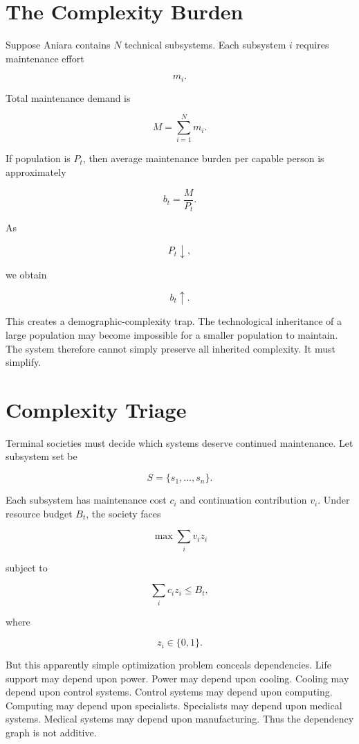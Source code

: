 \documentclass[11pt,oneside]{book}
\theoremstyle{definition}
\theoremstyle{remark}
\begin{document}
\section{The Complexity Burden}

Suppose Aniara contains \(N\) technical subsystems. Each subsystem \(i\) requires maintenance effort

\[
m_i.
\]

Total maintenance demand is

\[
M = \sum_{i=1}^{N}m_i.
\]

If population is \(P_t\), then average maintenance burden per capable person is approximately

\[
b_t = \frac{M}{P_t}.
\]

As

\[
P_t\downarrow,
\]

we obtain

\[
b_t\uparrow.
\]

This creates a demographic-complexity trap. The technological inheritance of a large population may
become impossible for a smaller population to maintain. The system therefore cannot simply preserve
all inherited complexity. It must simplify.

\section{Complexity Triage}

Terminal societies must decide which systems deserve continued maintenance. Let subsystem set be

\[
S=\{s_1,\ldots,s_n\}.
\]

Each subsystem has maintenance cost \(c_i\) and continuation contribution \(v_i\). Under resource
budget \(B_t\), the society faces

\[
\max \sum_i v_i z_i
\]

subject to

\[
\sum_i c_i z_i\leq B_t,
\]

where

\[
z_i\in\{0,1\}.
\]

But this apparently simple optimization problem conceals dependencies. Life support may depend upon
power. Power may depend upon cooling. Cooling may depend upon control systems. Control systems may
depend upon computing. Computing may depend upon specialists. Specialists may depend upon medical
systems. Medical systems may depend upon manufacturing. Thus the dependency graph is not additive.
\end{document}
